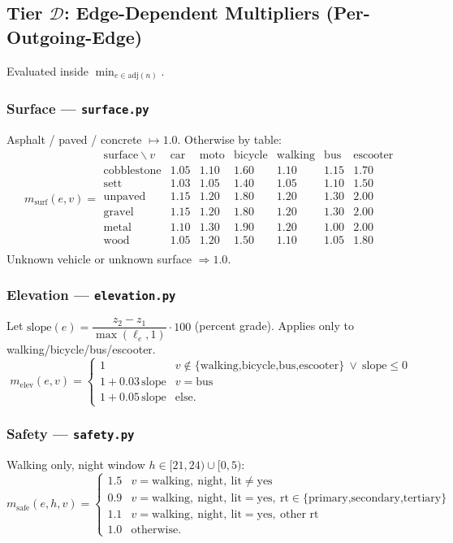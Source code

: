 \documentclass[12pt,a4paper]{article}
\begin{document}
\subsection{Tier $\mathcal{D}$: Edge-Dependent Multipliers (Per-Outgoing-Edge)}

Evaluated inside $\displaystyle\min_{e\in\mathrm{adj}(n)}$.

\subsubsection{Surface — \texttt{surface.py}}
Asphalt / paved / concrete $\mapsto 1.0$. Otherwise by table:
\[
m_{\text{surf}}(e,v) =
\begin{array}{c|cccccc}
\text{surface}\backslash v & \text{car} & \text{moto} & \text{bicycle} & \text{walking} & \text{bus} & \text{escooter} \\\hline
\text{cobblestone} & 1.05 & 1.10 & 1.60 & 1.10 & 1.15 & 1.70 \\
\text{sett}        & 1.03 & 1.05 & 1.40 & 1.05 & 1.10 & 1.50 \\
\text{unpaved}     & 1.15 & 1.20 & 1.80 & 1.20 & 1.30 & 2.00 \\
\text{gravel}      & 1.15 & 1.20 & 1.80 & 1.20 & 1.30 & 2.00 \\
\text{metal}       & 1.10 & 1.30 & 1.90 & 1.20 & 1.00 & 2.00 \\
\text{wood}        & 1.05 & 1.20 & 1.50 & 1.10 & 1.05 & 1.80 \\
\end{array}
\]
Unknown vehicle or unknown surface $\Rightarrow 1.0$.

\subsubsection{Elevation — \texttt{elevation.py}}
Let $\text{slope}(e) = \dfrac{z_2 - z_1}{\max(\ell_e,1)}\cdot 100$ (percent grade). Applies only to walking/bicycle/bus/escooter.
\[
m_{\text{elev}}(e,v) =
\begin{cases}
1 & v\notin\{\text{walking,bicycle,bus,escooter}\}\ \lor\ \text{slope}\le 0 \\
1 + 0.03\,\text{slope} & v=\text{bus} \\
1 + 0.05\,\text{slope} & \text{else.}
\end{cases}
\]

\subsubsection{Safety — \texttt{safety.py}} Walking only, night window $h\in[21,24)\cup[0,5)$:
\[
m_{\text{safe}}(e,h,v) =
\begin{cases}
1.5 & v=\text{walking},\ \text{night},\ \text{lit}\ne\text{yes} \\
0.9 & v=\text{walking},\ \text{night},\ \text{lit}=\text{yes},\ \text{rt}\in\{\text{primary,secondary,tertiary}\} \\
1.1 & v=\text{walking},\ \text{night},\ \text{lit}=\text{yes},\ \text{other rt} \\
1.0 & \text{otherwise.}
\end{cases}
\]
\end{document}
